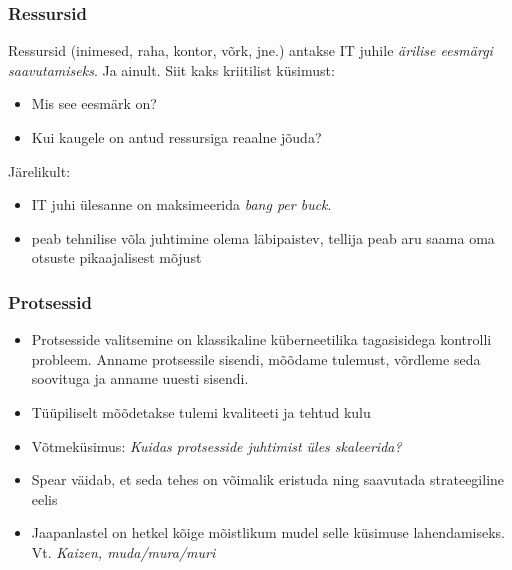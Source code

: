 \begin{frame}[fragile]
  \frametitle{Ressursid}
	Ressursid (inimesed, raha, kontor, võrk, jne.) antakse IT juhile \emph{ärilise eesmärgi saavutamiseks}. Ja ainult. Siit kaks kriitilist küsimust:
	\begin{itemize}
		\item Mis see eesmärk on?
		\item Kui kaugele on antud ressursiga reaalne jõuda?
	\end{itemize}

	Järelikult:
	\begin{itemize}
		\item IT juhi ülesanne on maksimeerida \emph{bang per buck}. 
		\item peab tehnilise võla juhtimine olema läbipaistev, tellija peab aru saama oma otsuste pikaajalisest mõjust
	\end{itemize}
\end{frame}


\begin{frame}[fragile]
  \frametitle{Protsessid}
	\begin{itemize}
		\item Protsesside valitsemine on klassikaline küberneetilika tagasisidega kontrolli probleem. Anname protsessile sisendi, mõõdame tulemust, võrdleme seda soovituga ja anname uuesti sisendi. 
		\item Tüüpiliselt mõõdetakse tulemi kvaliteeti ja tehtud kulu
		\item Võtmeküsimus: \emph{Kuidas protsesside juhtimist üles skaleerida?}
		\item Spear \citep{spear2010high} väidab, et seda tehes on võimalik eristuda ning saavutada strateegiline eelis
		\item Jaapanlastel on hetkel kõige mõistlikum mudel selle küsimuse lahendamiseks. Vt. \emph{Kaizen, muda/mura/muri}
	\end{itemize}
\end{frame}


